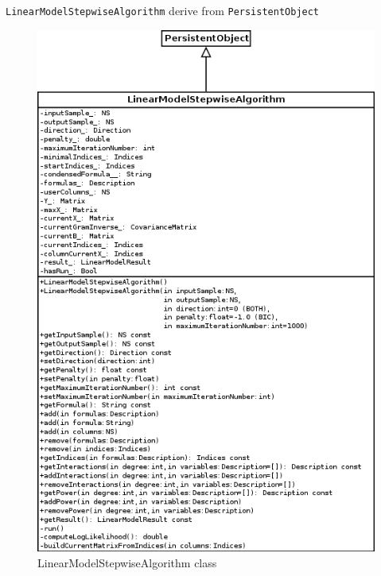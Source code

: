 \texttt{LinearModelStepwiseAlgorithm} derive from \texttt{PersistentObject}
\begin{figure}[htb]
  \begin{center}
    \includegraphics[scale=0.5]{LinearModelStepwiseAlgorithm.png}
    \caption{LinearModelStepwiseAlgorithm class}\label{fig:archi:LinearModelStepwiseAlgorithm}
  \end{center}
\end{figure}
